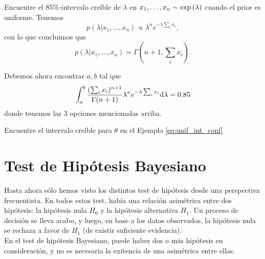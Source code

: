 \begin{example} Encuentre el 85\%-intervalo creíble de $\lambda$ en $x_1,\ldots, x_n\sim \exp\left(\lambda\right)$ cuando el prior es uniforme. Tenemos 
\begin{equation}
    p(\lambda|x_1,\ldots, x_n) \propto \lambda^ne^{-\lambda\sum_i x_i},
\end{equation}
con lo que concluimos que
\begin{equation}
p(\lambda|x_1,\ldots, x_n) = \Gamma(n+1,\sum_i x_i).
\end{equation}

Debemos ahora encontrar $a,b$ tal que 
\begin{equation}
    \int_a^b \frac{(\sum_i x_i)^{n+1}}{\Gamma(n+1)}\lambda^ne^{-\lambda\sum_i x_i}{\text{d}}\lambda = 0.85
\end{equation}
donde tenemos las 3 opciones mencionadas arriba.
\end{example}

\begin{exercise} Encuentre el intervalo creíble para $\theta$ en el Ejemplo \ref{eq:unif_int_conf}
\end{exercise}





\section{Test de Hipótesis Bayesiano}
 Hasta ahora sólo hemos visto los distintos test de hipótesis desde una perspectiva frecuentista. En todos estos test, había una relación asimétrica entre dos hipótesis: la hipótesis nula $H_0$ y la hipótesis alternativa $H_1$. Un proceso de decisión se lleva acabo, y luego, en base a los datos observados, la hipótesis nula se rechaza a favor de $H_1$ (de existir suficiente evidencia). \\
 En el test de hipótesis Bayesiano, puede haber dos o más hipótesis en consideración, y no es necesaria la exitencia de una asimétrica entre ellas.\\

